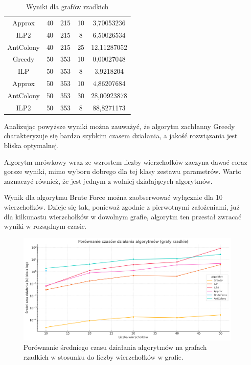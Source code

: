 \begin{table}[H]
\begin{tabular}{|c|c|c|c|c|}
    Approx & 40 & 215 & 10 & 3,70053236 \\
    ILP2 & 40 & 215 & 8 & 6,50026534 \\
    AntColony & 40 & 215 & 25 & 12,11287052 \\
    \hline
    Greedy & 50 & 353 & 10 & 0,00027048 \\
    ILP & 50 & 353 & 8 & 3,9218204 \\
    Approx & 50 & 353 & 10 & 4,86207684 \\
    AntColony & 50 & 353 & 30 & 28,00923878 \\
    ILP2 & 50 & 353 & 8 & 88,8271173 \\   
    \hline
    \end{tabular}
    \caption{Wyniki dla grafów rzadkich}
    \end{table}

    Analizując powyższe wyniki można zauważyć, że algorytm zachłanny Greedy charakteryzuje się bardzo szybkim czasem działania, a jakość rozwiązania jest bliska optymalnej.

    Algorytm mrówkowy wraz ze wzrostem liczby wierzchołków zaczyna dawać coraz gorsze wyniki, mimo wyboru dobrego dla tej klasy zestawu parametrów. Warto zaznaczyć również, że jest jednym z wolniej działających algorytmów.

    Wynik dla algorytmu Brute Force można zaobserwować wyłącznie dla 10 wierzchołków. Dzieje się tak, ponieważ zgodnie z pierwotnymi założeniami, już dla kilkunastu wierzchołków w dowolnym grafie, algorytm ten przestał zwracać wyniki w rozsądnym czasie.

    \begin{figure}[H]
        \centering
        \includegraphics[width=\textwidth]{assets/sparse.png}
        \caption{Porównanie średniego czasu działania algorytmów na grafach rzadkich w stosunku do liczby wierzchołków w grafie.}
        \label{fig:sparsePlot}
    \end{figure}

